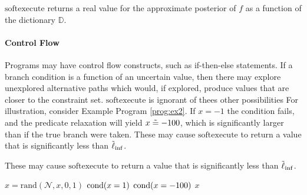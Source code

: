 $\textrm{softexecute}$ returns a real value for the approximate posterior of $f$ as a function of the dictionary $\mathbb{D}$.

\paragraph{Control Flow}
Programs may have control flow constructs, such as if-then-else statements.
If a branch condition is a function of an uncertain value, then there may explore unexplored alternative paths which would, if explored, produce values that are closer to the constraint set.
$\textrm{softexecute}$ is ignorant of thees other possibilities
For illustration, consider Example Program \ref{prog:ex2}.
If $x = -1$ the condition fails, and the predicate relaxation will yield $x \mathrel{\tilde{=}} -100$, which is significantly larger than if the true branch were taken.
These may cause $\textrm{softexecute}$ to return a value that is significantly less than $\mathrel{\tilde{\operatorname{\ell}}}_{\inf}$.

These may cause $\textrm{softexecute}$ to return a value that is significantly less than $\mathrel{\tilde{\operatorname{\ell}}}_{\inf}$.


\begin{exprogram}[tb]
\caption{}
\label{prog:ex2}
\begin{algorithmic}
\STATE $x = \textrm{rand}(\mathcal{N}, x, 0, 1)$
\STATE $\operatorname{cond}(x = 1)$
\ELSE
\STATE $\operatorname{cond}(x = -100)$
\ENDIF
{} $x$
\end{algorithmic}
\end{exprogram}



